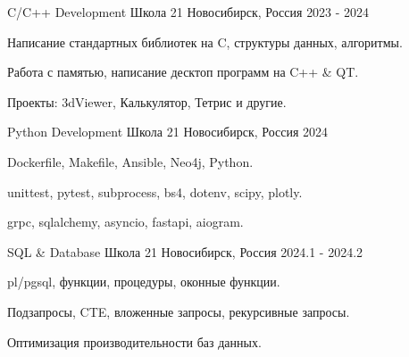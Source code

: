 \begin{cventries}
\end{cventries}



\begin{cventries}

  \cventry
    {C/C++ Development} %
    {Школа 21} %
    {Новосибирск, Россия} %
    {2023 - 2024} %
    {
      \begin{cvitems} %
        \item {Написание стандартных библиотек на C, структуры данных, алгоритмы.}
        \item {Работа с памятью, написание десктоп программ на C++ \& QT.}
        \item {Проекты: 3dViewer, Калькулятор, Тетрис и другие.}
      \end{cvitems}
    }

  \cventry
    {Python Development} %
    {Школа 21} %
    {Новосибирск, Россия} %
    {2024} %
    {
      \begin{cvitems} %
        \item {Dockerfile, Makefile, Ansible, Neo4j, Python.}
        \item {unittest, pytest, subprocess, bs4, dotenv, scipy, plotly.}
        \item {grpc, sqlalchemy, asyncio, fastapi, aiogram.}
      \end{cvitems}
    }

  \cventry
    {SQL \& Database} %
    {Школа 21} %
    {Новосибирск, Россия} %
    {2024.1 - 2024.2} %
    {
      \begin{cvitems} %
        \item {pl/pgsql, функции, процедуры, оконные функции.}
        \item {Подзапросы, CTE, вложенные запросы, рекурсивные запросы.}
        \item {Оптимизация производительности баз данных.}
      \end{cvitems}
    }


\end{cventries}
